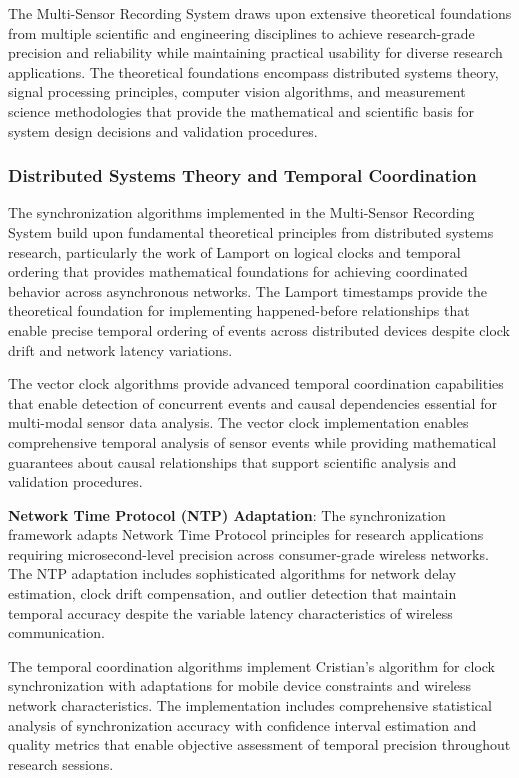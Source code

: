 \documentclass[12pt,a4paper]{report}
\begin{document}
The Multi-Sensor Recording System draws upon extensive theoretical foundations from multiple scientific and engineering
disciplines to achieve research-grade precision and reliability while maintaining practical usability for diverse
research applications. The theoretical foundations encompass distributed systems theory, signal processing principles,
computer vision algorithms, and measurement science methodologies that provide the mathematical and scientific basis for
system design decisions and validation procedures.

\subsubsection{Distributed Systems Theory and Temporal Coordination}

The synchronization algorithms implemented in the Multi-Sensor Recording System build upon fundamental theoretical
principles from distributed systems research, particularly the work of Lamport on logical clocks and temporal ordering
that provides mathematical foundations for achieving coordinated behavior across asynchronous networks. The Lamport
timestamps provide the theoretical foundation for implementing happened-before relationships that enable precise
temporal ordering of events across distributed devices despite clock drift and network latency variations.

The vector clock algorithms provide advanced temporal coordination capabilities that enable detection of concurrent
events and causal dependencies essential for multi-modal sensor data analysis. The vector clock implementation enables
comprehensive temporal analysis of sensor events while providing mathematical guarantees about causal relationships that
support scientific analysis and validation procedures.

\textbf{Network Time Protocol (NTP) Adaptation}: The synchronization framework adapts Network Time Protocol principles for
research applications requiring microsecond-level precision across consumer-grade wireless networks. The NTP adaptation
includes sophisticated algorithms for network delay estimation, clock drift compensation, and outlier detection that
maintain temporal accuracy despite the variable latency characteristics of wireless communication.

The temporal coordination algorithms implement Cristian's algorithm for clock synchronization with adaptations for
mobile device constraints and wireless network characteristics. The implementation includes comprehensive statistical
analysis of synchronization accuracy with confidence interval estimation and quality metrics that enable objective
assessment of temporal precision throughout research sessions.
\end{document}
